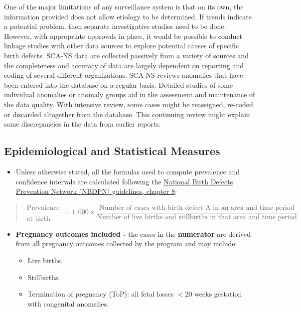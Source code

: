 \documentclass[
]{krantz}
\providecommand{\tightlist}{%
  \setlength{\itemsep}{0pt}\setlength{\parskip}{0pt}}
\begin{document}
One of the major limitations of any surveillance system is that on its own, the information provided does not allow etiology to be determined. If trends indicate a potential problem, then separate investigative studies need to be done. However, with appropriate approvals in place, it would be possible to conduct linkage studies with other data sources to explore potential causes of specific birth defects. SCA-NS data are collected passively from a variety of sources and the completeness and accuracy of data are largely dependent on reporting and coding of several different organizations. SCA-NS reviews anomalies that have been entered into the database on a regular basis. Detailed studies of some individual anomalies or anomaly groups aid in the assessment and maintenance of the data quality. With intensive review, some cases might be reassigned, re-coded or discarded altogether from the database. This continuing review might explain some discrepancies in the data from earlier reports.

\hypertarget{epidemiological-and-statistical-measures}{%
\subsection*{Epidemiological and Statistical Measures}\label{epidemiological-and-statistical-measures}}


\begin{itemize}
\tightlist
\item
  Unless otherwise stated, all the formulas used to compute prevalence and confidence intervals are calculated following the \href{http://www.nbdpn.org/docs/Ch_8_Statistics6-04_2016DEC14.pdf}{National Birth Defects Prevention Network (NBDPN) guidelines, chapter 8}:
\end{itemize}

\begin{quote}
\[
\substack{\text{Prevalence} \\ \\ \text{at birth}} = 1,000 \times \dfrac{\text{Number of cases with birth defect A in an area and time period}}{\text{Number of live births and stillbirths in that area and time period}}
\]
\end{quote}

\begin{itemize}
\tightlist
\item
  \textbf{Pregnancy outcomes included -} the cases in the \textbf{numerator} are derived from all pregnancy outcomes collected by the program and may include:

  \begin{itemize}
  \tightlist
  \item
    Live births.
  \item
    Stillbirths.
  \item
    Termination of pregnancy (ToP): all fetal losses \(< 20\) weeks gestation with congenital anomalies.
  \end{itemize}
\end{itemize}
\end{document}
